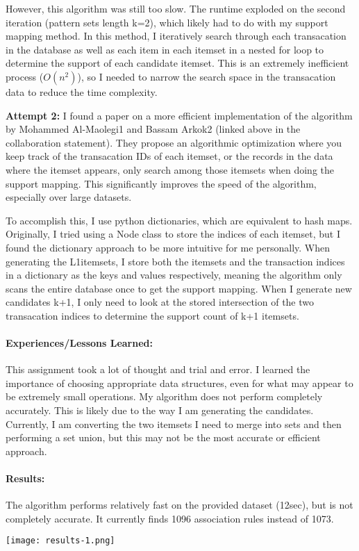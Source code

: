 \documentclass{article}
\begin{document}
However, this algorithm was still too slow. The runtime exploded on the second iteration (pattern sets length k=2), which likely had to do with my support mapping method. In this method, I iteratively search through each transacation in the database as well as each item in each itemset in a nested for loop to determine the support of each candidate itemset. This is an extremely inefficient process ($O(n^2)$), so I needed to narrow the search space in the transacation data to reduce the time complexity. 

\textbf{Attempt 2:} I found a paper on a more efficient implementation of the algorithm by Mohammed Al-Maolegi1 and Bassam Arkok2 (linked above in the collaboration statement). They propose an algorithmic optimization where you keep track of the transacation IDs of each itemset, or the records in the data where the itemset appears, only search among those itemsets when doing the support mapping. This significantly improves the speed of the algorithm, especially over large datasets.

To accomplish this, I use python dictionaries, which are equivalent to hash maps. Originally, I tried using a Node class to store the indices of each itemset, but I found the dictionary approach to be more intuitive for me personally. When generating the L1itemsets, I store both the itemsets and the transaction indices in a dictionary as the keys and values respectively, meaning the algorithm only scans the entire database once to get the support mapping. When I generate new candidates k+1, I only need to look at the stored intersection of the two transacation indices to determine the support count of k+1 itemsets. 

\paragraph{\textbf{Experiences/Lessons Learned:}} This assignment took a lot of thought and trial and error. I learned the importance of choosing appropriate data structures, even for what may appear to be extremely small operations. My algorithm does not perform completely accurately. This is likely due to the way I am generating the candidates. Currently, I am converting the two itemsets I need to merge into sets and then performing a set union, but this may not be the most accurate or efficient approach.

\paragraph{\textbf{Results:}} The algorithm performs relatively fast on the provided dataset (12sec), but is not completely accurate. It currently finds 1096 association rules instead of 1073. 

\texttt{[image: results-1.png]}
\end{document}

